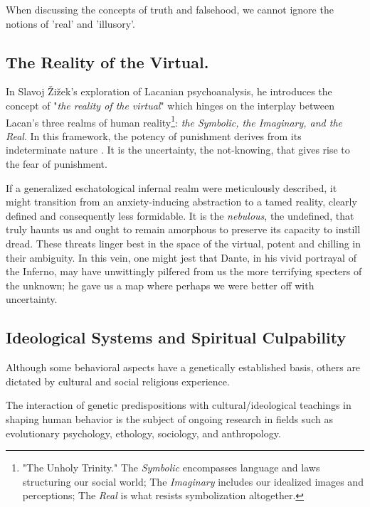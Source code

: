\documentclass[11pt,a4]{article}
\begin{document}
When discussing the concepts of truth and falsehood, we cannot
ignore the notions of 'real' and 'illusory'.


 \subsection{The Reality of the Virtual.} \label{reality}

        In Slavoj Žižek's exploration of Lacanian psychoanalysis, he introduces
        the concept of "\textit{the reality of the virtual}" which hinges on the interplay between
        Lacan's three realms of human reality\footnote{"The Unholy Trinity." The \textit{Symbolic}
        encompasses language and laws structuring our social world; The \textit{Imaginary} includes
        our idealized images and perceptions; The \textit{Real} is what resists
        symbolization altogether.}: \textit{the Symbolic, the Imaginary, and the Real}\cite{lacan1981four}.
        In this framework, the potency of punishment derives from its indeterminate
        nature \cite{Borretzen2012-tx}. It is the uncertainty, the not-knowing, that gives rise
        to the fear of punishment.

        If a generalized eschatological infernal realm were meticulously described, it might transition
        from an anxiety-inducing abstraction to a tamed reality, clearly defined and consequently less
        formidable. It is the \textit{nebulous}, the undefined, that truly haunts us and ought to remain
        amorphous to preserve its capacity to instill dread. These threats linger best in the space of
        the virtual, potent and chilling in their ambiguity. In this vein, one might jest that Dante,
        in his vivid portrayal of the Inferno, may have unwittingly pilfered from us the more terrifying
        specters of the unknown; he gave us a map where perhaps we were better off with uncertainty.


    \subsection{Ideological Systems and Spiritual Culpability} \label{religion}

    Although some behavioral aspects have a genetically established basis, others are dictated by
    cultural and social religious experience.

    The interaction of genetic predispositions with cultural/ideological teachings in shaping human
    behavior is the subject of ongoing research in fields such as evolutionary psychology, ethology,
    sociology, and anthropology.
\end{document}
